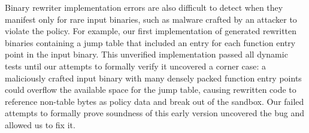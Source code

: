 {  %


  Binary rewriter implementation errors are also difficult to detect when they manifest only for rare input binaries, such as malware crafted by an attacker to violate the policy.
  For example, our first implementation of \pname{} generated rewritten binaries containing a jump table that included an entry for each function entry point in the input binary.
  This unverified implementation passed all dynamic tests until our attempts to formally verify it uncovered a corner case:
  a maliciously crafted input binary with many densely packed function entry points could overflow the available space for the jump table, causing rewritten code to reference non-table bytes as policy data and break out of the sandbox.
  Our failed attempts to formally prove soundness of this early version uncovered the bug and allowed us to fix it.

}
